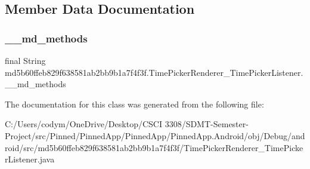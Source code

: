 \subsection{Member Data Documentation}
\mbox{\label{classmd5b60ffeb829f638581ab2bb9b1a7f4f3f_1_1_time_picker_renderer___time_picker_listener_a89be3c5d1a25817d66484c33310bfee7}} 
\subsubsection{\texorpdfstring{\+\_\+\+\_\+md\+\_\+methods}{\_\_md\_methods}}
{\footnotesize\ttfamily final String md5b60ffeb829f638581ab2bb9b1a7f4f3f.\+Time\+Picker\+Renderer\+\_\+\+Time\+Picker\+Listener.\+\_\+\+\_\+md\+\_\+methods\hspace{0.3cm}{\ttfamily [static]}}



The documentation for this class was generated from the following file\+:\begin{DoxyCompactItemize}
\item 
C\+:/\+Users/codym/\+One\+Drive/\+Desktop/\+C\+S\+C\+I 3308/\+S\+D\+M\+T-\/\+Semester-\/\+Project/src/\+Pinned/\+Pinned\+App/\+Pinned\+App/\+Pinned\+App.\+Android/obj/\+Debug/android/src/md5b60ffeb829f638581ab2bb9b1a7f4f3f/Time\+Picker\+Renderer\+\_\+\+Time\+Picker\+Listener.\+java\end{DoxyCompactItemize}
